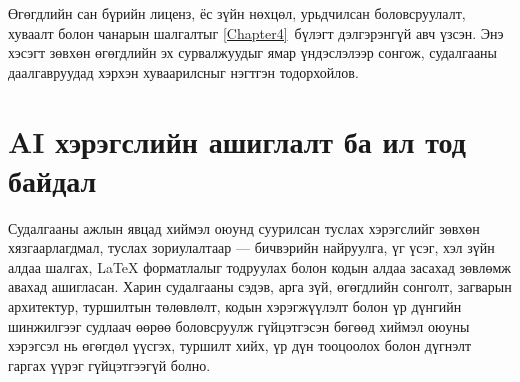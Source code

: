 Өгөгдлийн сан бүрийн лиценз, ёс зүйн нөхцөл, урьдчилсан боловсруулалт, хуваалт болон чанарын шалгалтыг \ref{Chapter4}~бүлэгт дэлгэрэнгүй авч үзсэн. Энэ хэсэгт зөвхөн өгөгдлийн эх сурвалжуудыг ямар үндэслэлээр сонгож, судалгааны даалгавруудад хэрхэн хуваарилсныг нэгтгэн тодорхойлов.


\section{AI хэрэгслийн ашиглалт ба ил тод байдал}

Судалгааны ажлын явцад хиймэл оюунд суурилсан туслах хэрэгслийг зөвхөн хязгаарлагдмал, туслах зориулалтаар — бичвэрийн найруулга, үг үсэг, хэл зүйн алдаа шалгах, \LaTeX{} форматлалыг тодруулах болон кодын алдаа засахад зөвлөмж авахад ашигласан. Харин судалгааны сэдэв, арга зүй, өгөгдлийн сонголт, загварын архитектур, туршилтын төлөвлөлт, кодын хэрэгжүүлэлт болон үр дүнгийн шинжилгээг судлаач өөрөө боловсруулж гүйцэтгэсэн бөгөөд хиймэл оюуны хэрэгсэл нь өгөгдөл үүсгэх, туршилт хийх, үр дүн тооцоолох болон дүгнэлт гаргах үүрэг гүйцэтгээгүй болно.
